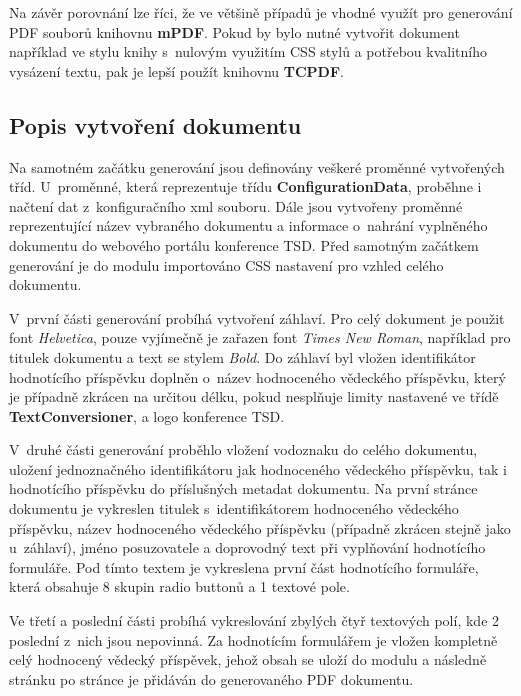 \par
Na závěr porovnání lze říci, že ve většině případů je vhodné využít pro generování PDF souborů knihovnu \textbf{mPDF}. Pokud by bylo nutné vytvořit dokument například ve stylu knihy s~nulovým využitím CSS stylů a potřebou kvalitního vysázení textu, pak je lepší použít knihovnu \textbf{TCPDF}. 

\subsection{Popis vytvoření dokumentu}
Na samotném začátku generování jsou definovány veškeré proměnné vytvořených tříd. U~proměnné, která reprezentuje třídu \textbf{ConfigurationData}, proběhne i načtení dat z~konfiguračního xml souboru. Dále jsou vytvořeny proměnné reprezentující název vybraného dokumentu a informace o~nahrání vyplněného dokumentu do webového portálu konference TSD. Před samotným začátkem generování je do modulu importováno CSS nastavení pro vzhled celého dokumentu.
\par
V~první části generování probíhá vytvoření záhlaví. Pro celý dokument je použit font \textit{Helvetica}, pouze vyjímečně je zařazen font \textit{Times New Roman}, například pro titulek dokumentu a text se stylem \textit{Bold}. Do záhlaví byl vložen identifikátor hodnotícího příspěvku doplněn o~název hodnoceného vědeckého příspěvku, který je případně zkrácen na určitou délku, pokud nesplňuje limity nastavené ve třídě \textbf{TextConversioner}, a logo konference TSD. 
\par
V~druhé části generování proběhlo vložení vodoznaku do celého dokumentu, uložení jednoznačného identifikátoru jak hodnoceného vědeckého příspěvku, tak i hodnotícího příspěvku do příslušných metadat dokumentu. Na první stránce dokumentu je vykreslen titulek s~identifikátorem hodnoceného vědeckého příspěvku, název hodnoceného vědeckého příspěvku (případně zkrácen stejně jako u~záhlaví), jméno posuzovatele a doprovodný text při vyplňování hodnotícího formuláře. Pod tímto textem je vykreslena první část hodnotícího formuláře, která obsahuje 8 skupin radio buttonů a 1 textové pole.
\par
Ve třetí a poslední části probíhá vykreslování zbylých čtyř textových polí, kde 2 poslední z~nich jsou nepovinná. Za hodnotícím formulářem je vložen kompletně celý hodnocený vědecký příspěvek, jehož obsah se uloží do modulu a následně stránku po stránce je přidáván do generovaného PDF dokumentu.
